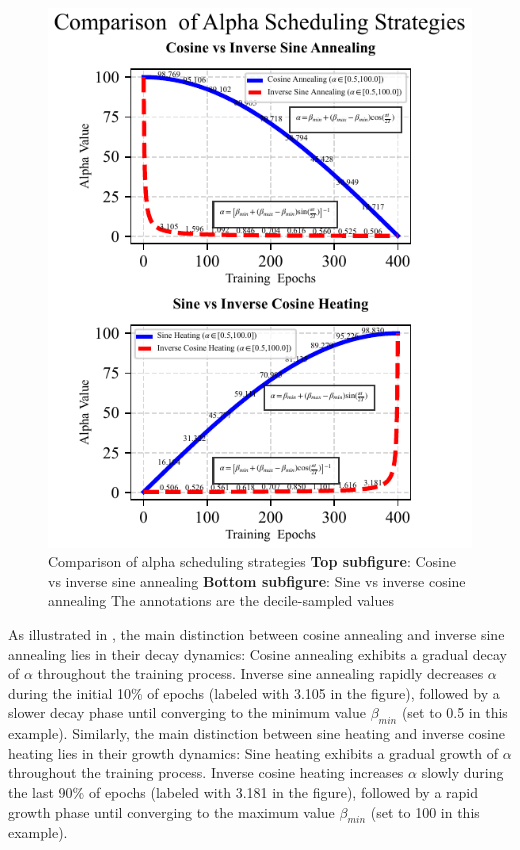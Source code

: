 \documentclass[10pt,twocolumn,letterpaper]{article}
\begin{document}
\begin{figure}[htbp]
	\center
	\vspace{-10pt} 
	\includegraphics[width=\columnwidth]{images/AlphaSch.pdf}
	\caption{Comparison of alpha scheduling strategies
	\textbf{Top subfigure}: Cosine vs inverse sine annealing
    \textbf{Bottom subfigure}: Sine vs inverse cosine annealing
	The annotations are the decile-sampled values
	}
	\label{fig:AlphaSch}
\end{figure}

As illustrated in , the main distinction between cosine annealing and inverse sine annealing lies in their decay dynamics: Cosine annealing exhibits a gradual decay of $\alpha$ throughout the training process. Inverse sine annealing rapidly decreases $\alpha$ during the initial 10\% of epochs (labeled with 3.105 in the figure), followed by a slower decay phase until converging to the minimum value $\beta_{min}$ (set to 0.5 in this example). Similarly, the main distinction between sine heating and inverse cosine heating lies in their growth dynamics: Sine heating exhibits a gradual growth of $\alpha$ throughout the training process. Inverse cosine heating increases $\alpha$ slowly during the last 90\% of epochs (labeled with 3.181 in the figure), followed by a rapid growth phase until converging to the maximum value $\beta_{min}$ (set to 100 in this example).
\end{document}
